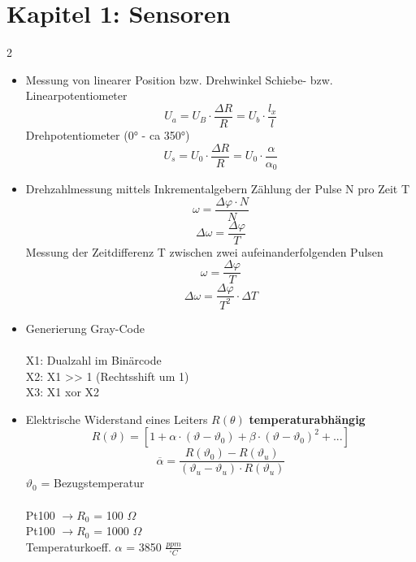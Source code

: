 \section{Kapitel 1: Sensoren}

\begin{multicols*}{2}
	
\begin{itemize}
	
	\item Messung von linearer Position bzw. Drehwinkel
	\subitem Schiebe- bzw. Linearpotentiometer
	\[ U_a = U_B \cdot \frac{\Delta R}{R} = U_b \cdot \frac{l_x}{l} \]
	\subitem Drehpotentiometer (0° - ca 350°)
	\[ U_s = U_0 \cdot \frac{\Delta R}{R} = U_0 \cdot \frac{\alpha}{\alpha_0} \]
	
	\vspace{1cm}
	
	\item Drehzahlmessung mittels Inkrementalgebern
	\subitem Zählung der Pulse N pro Zeit T
	\[ \omega = \frac{\Delta\varphi \cdot N}{N} \]
	\[ \Delta\omega = \frac{\Delta\varphi}{T}\]
	\subitem Messung der Zeitdifferenz T zwischen zwei aufeinanderfolgenden Pulsen
	\[ \omega = \frac{\Delta\varphi}{T} \]
	\[ \Delta\omega = \frac{\Delta\varphi}{T^2} \cdot \Delta T \]

	\vspace{1cm}

	\item Generierung Gray-Code\\
	\\
	X1: Dualzahl im Binärcode\\
	X2: X1 >> 1 (Rechtsshift um 1)\\
	X3: X1 xor X2

	\vspace{1cm}
	
	\item Elektrische Widerstand eines Leiters $R(\theta)$ \textbf{temperaturabhängig}
	\[ R(\vartheta) = [1 + \alpha\cdot(\vartheta - \vartheta_0) + \beta\cdot(\vartheta - \vartheta_0)^2 + ...] \]
	\[ \overline{\alpha} = \frac{R(\vartheta_0) - R(\vartheta_u)}{(\vartheta_u - \vartheta_u)\cdot R(\vartheta_u)} \]
	$\vartheta_0$ = Bezugstemperatur\\
	\\
	Pt100 $\rightarrow R_0$ = 100 $\Omega$ \\
	Pt100 $\rightarrow R_0$ = 1000 $\Omega$ \\
	Temperaturkoeff. $\alpha$ = 3850 $\frac{ppm}{^\circ C}$


\end{itemize}
\end{multicols*}
